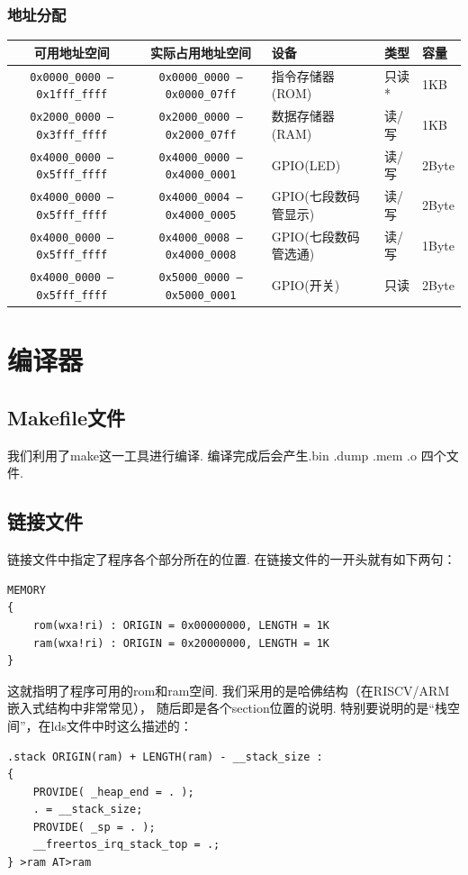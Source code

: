 \documentclass[lang=cn,11pt,a4paper,chinesefont=founder]{elegantpaper}
\begin{document}
\subsubsection{地址分配}
\begin{table}[h!]
    \centering
    \begin{tabular}{cclll}
        \toprule
        可用地址空间                           & 实际占用地址空间                       & 设备                 & 类型  & 容量  \\
        \midrule
        \texttt{0x0000\_0000 --- 0x1fff\_ffff} & \texttt{0x0000\_0000 --- 0x0000\_07ff} & 指令存储器(ROM)      & 只读* & 1KB  \\
        \texttt{0x2000\_0000 --- 0x3fff\_ffff} & \texttt{0x2000\_0000 --- 0x2000\_07ff} & 数据存储器(RAM)      & 读/写 & 1KB  \\
        \texttt{0x4000\_0000 --- 0x5fff\_ffff} & \texttt{0x4000\_0000 --- 0x4000\_0001} & GPIO(LED)            & 读/写 & 2Byte \\
        \texttt{0x4000\_0000 --- 0x5fff\_ffff} & \texttt{0x4000\_0004 --- 0x4000\_0005} & GPIO(七段数码管显示) & 读/写 & 2Byte \\
        \texttt{0x4000\_0000 --- 0x5fff\_ffff} & \texttt{0x4000\_0008 --- 0x4000\_0008} & GPIO(七段数码管选通) & 读/写 & 1Byte \\
        \texttt{0x4000\_0000 --- 0x5fff\_ffff} & \texttt{0x5000\_0000 --- 0x5000\_0001} & GPIO(开关)           & 只读  & 2Byte \\
        \bottomrule
    \end{tabular}
\end{table}
\section{编译器}

\subsection{Makefile文件}

我们利用了make这一工具进行编译. 编译完成后会产生.bin .dump .mem .o 四个文件.


\subsection{链接文件}

链接文件中指定了程序各个部分所在的位置. 在链接文件的一开头就有如下两句：

\begin{lstlisting}
MEMORY
{
    rom(wxa!ri) : ORIGIN = 0x00000000, LENGTH = 1K
    ram(wxa!ri) : ORIGIN = 0x20000000, LENGTH = 1K
}
\end{lstlisting}
这就指明了程序可用的rom和ram空间. 我们采用的是哈佛结构（在RISCV/ARM嵌入式结构中非常常见），
随后即是各个section位置的说明. 特别要说明的是“栈空间”，在lds文件中时这么描述的：
\begin{lstlisting}
.stack ORIGIN(ram) + LENGTH(ram) - __stack_size :
{
    PROVIDE( _heap_end = . );
    . = __stack_size;
    PROVIDE( _sp = . );
    __freertos_irq_stack_top = .;
} >ram AT>ram
\end{lstlisting}
\end{document}
